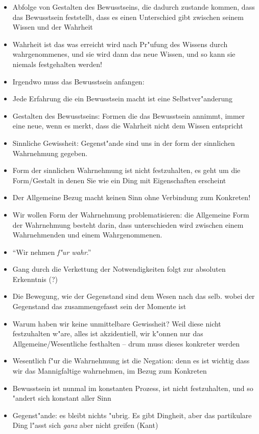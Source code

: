 \documentclass[emulatestandardclasses]{scrartcl}
\begin{document}
\begin{itemize}
  \item Abfolge von Gestalten des Bewusstseins, die dadurch zustande kommen, dass das Bewusstsein feststellt, dass es einen Unterschied gibt zwischen seinem Wissen und der Wahrheit 
  \item Wahrheit ist das was erreicht wird nach Pr"ufung des Wissens durch wahrgenommenes, und sie wird dann das neue Wissen, und so kann sie niemals festgehalten werden!
  \item Irgendwo muss das Bewusstsein anfangen: 
  \item Jede Erfahrung die ein Bewusstsein macht ist eine Selbstver"anderung
  \item Gestalten des  Bewusstseins: Formen die das Bewusstsein annimmt, immer eine neue, wenn es merkt, dass die Wahrheit nicht dem Wissen entspricht
  \item Sinnliche Gewissheit: Gegenst"ande sind uns in der form der sinnlichen Wahrnehmung gegeben.
  \item Form der sinnlichen Wahrnehmung ist nicht festzuhalten, es geht um die Form/Gestalt in denen Sie wie ein Ding mit Eigenschaften erscheint
  \item Der Allgemeine Bezug macht keinen Sinn ohne Verbindung zum Konkreten!
  \item Wir wollen Form der Wahrnehmung problematisieren: die Allgemeine Form der Wahrnehmung besteht darin, dass unterschieden wird zwischen einem Wahrnehmenden und einem Wahrgenommenen. 
  \item "`Wir nehmen \emph{f"ur wahr}."'
  \item Gang durch die Verkettung der Notwendigkeiten folgt zur absoluten Erkenntnis (?)
  \item Die Bewegung, wie der Gegenstand sind dem Wesen nach das selb. wobei der Gegenstand das zusammengefasst sein der Momente ist
  \item Warum haben wir keine unmittelbare Gewissheit? Weil diese nicht festzuhalten w"are, alles ist akzidentiell, wir k"onnen nur das Allgemeine/Wesentliche festhalten -- drum muss dieses konkreter werden
  \item Wesentlich f"ur die Wahrnehmung ist die Negation: denn es ist wichtig dass wir das Mannigfaltige wahrnehmen, im Bezug zum Konkreten
  \item Bewusstsein ist nunmal im konstanten Prozess, ist nicht festzuhalten, und so "andert sich konstant aller Sinn
  \item Gegenst"ande: es bleibt nichts "ubrig. Es gibt Dingheit, aber das partikulare Ding l"asst sich \emph{ganz} aber nicht greifen (Kant)

\end{itemize}
\end{document}
